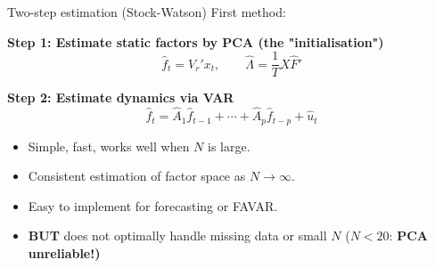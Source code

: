 \documentclass{beamer}
\begin{document}
\begin{frame}{Two-step estimation (Stock-Watson)}
\small
First method:

\medskip
\textbf{Step 1: Estimate static factors by PCA (the "initialisation")} \hyperlink{pca-algorithm}{}
\[
\hat{f}_t = V_r' x_t,
\qquad
\hat{\Lambda} = \frac{1}{T} X \hat{F}'
\]

\medskip

\textbf{Step 2: Estimate dynamics via VAR}
\[
\hat{f}_t = \hat{A}_1 \hat{f}_{t-1} + \cdots + \hat{A}_p \hat{f}_{t-p} + \hat{u}_t
\]

\begin{itemize}
  \item Simple, fast, works well when $N$ is large.
  \item Consistent estimation of factor space as $N \to \infty$.
  \item Easy to implement for forecasting or FAVAR.
  \item \textbf{BUT } does not optimally handle missing data or small $N$ ($N<20$:\textbf{ PCA unreliable!)}
\end{itemize}
\end{frame}
\end{document}
